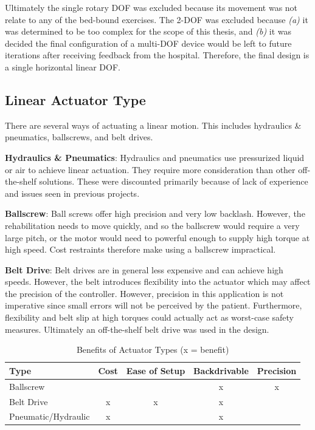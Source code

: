 \documentclass[12pt]{report}
\begin{document}
		Ultimately the single rotary DOF was excluded because its movement was not relate to any of the bed-bound exercises. The 2-DOF was excluded because \textit{(a)} it was determined to be too complex for the scope of this thesis, and \textit{(b)} it was decided the final configuration of a multi-DOF device would be left to future iterations after receiving feedback from the hospital. Therefore, the final design is a single horizontal linear DOF. 

					
		\subsection{Linear Actuator Type}

	There are several ways of actuating a linear motion. This includes hydraulics \& pneumatics, ballscrews, and belt drives.
	
	\textbf{Hydraulics \& Pneumatics}: Hydraulics and pneumatics use pressurized liquid or air to achieve linear actuation. They require more consideration than other off-the-shelf solutions. These were discounted primarily because of lack of experience and issues seen in previous projects. 

	\textbf{Ballscrew}: Ball screws offer high precision and very low backlash. However, the rehabilitation needs to move quickly, and so the ballscrew would require a very large pitch, or the motor would need to powerful enough to supply high torque at high speed. Cost restraints therefore make using a ballscrew impractical. 
	
	\textbf{Belt Drive}: Belt drives are in general less expensive and can achieve high speeds. However, the belt introduces flexibility into the actuator which may affect the precision of the controller. However, precision in this application is not imperative since small errors will not be perceived by the patient. Furthermore, flexibility and belt slip at high torques could actually act as worst-case safety measures. Ultimately an off-the-shelf belt drive was used in the design.


	
	\begin{table}[]
	\centering
	\caption{Benefits of Actuator Types (x = benefit)}	
	\begin{tabular}{|l|c|c|c|c|}
		\hline
		\textbf{Type} & \textbf{Cost} & \textbf{Ease of Setup} & 		\textbf{Backdrivable} & \textbf{Precision} \\ \hline
		Ballscrew &  &  & x & x \\ \hline
		Belt Drive & x & x & x & \\ \hline
		Pneumatic/Hydraulic & x &  & x & \\ \hline
		\end{tabular}
	\label{tab:actuator}
	\end{table}
				
\end{document}
